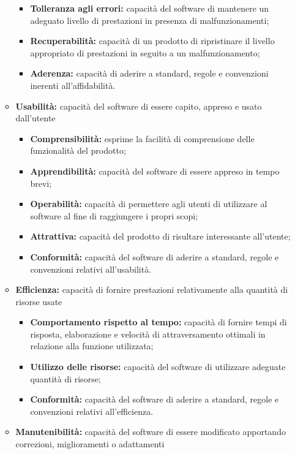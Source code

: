 \begin{itemize}
\begin{itemize}
\begin{itemize}
							\item \textbf{Tolleranza agli errori:} capacità del software di mantenere un adeguato livello di prestazioni in presenza di malfunzionamenti;
							\item \textbf{Recuperabilità:} capacità di un prodotto di ripristinare il livello appropriato di prestazioni in seguito a un malfunzionamento;
							\item \textbf{Aderenza:} capacità di aderire a standard, regole e convenzioni inerenti all'affidabilità.
						\end{itemize}
					\item \textbf{Usabilità:} capacità del software di essere capito, appreso e usato dall'utente
						\begin{itemize}
							\item \textbf{Comprensibilità:} esprime la facilità di comprensione delle funzionalità del prodotto;
							\item \textbf{Apprendibilità:} capacità del software di essere appreso in tempo brevi;
							\item \textbf{Operabilità:} capacità di permettere agli utenti di utilizzare al software al fine di raggiungere i propri scopi;
							\item \textbf{Attrattiva:} capacità del prodotto di risultare interessante all'utente;
							\item \textbf{Conformità:} capacità del software di aderire a standard, regole e convenzioni relativi all'usabilità.
						\end{itemize}
					\item \textbf{Efficienza:} capacità di fornire prestazioni relativamente alla quantità di risorse usate
						\begin{itemize}
							\item \textbf{Comportamento rispetto al tempo:} capacità di fornire tempi di risposta, elaborazione e velocità di attraversamento ottimali in relazione alla funzione utilizzata;
							\item \textbf{Utilizzo delle risorse:} capacità del software di utilizzare adeguate quantità di risorse;
							\item \textbf{Conformità:} capacità del software di aderire a standard, regole e convenzioni relativi all'efficienza.
						\end{itemize}
					\item \textbf{Manutenibilità:} capacità del software di essere modificato apportando correzioni, miglioramenti o adattamenti
						\begin{itemize}

\end{itemize}
\end{itemize}
\end{itemize}
